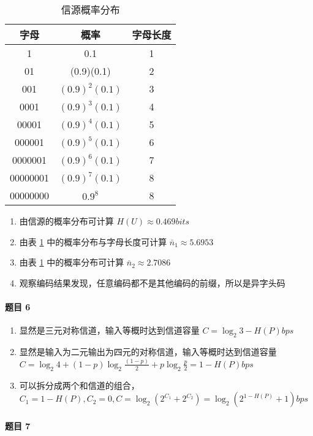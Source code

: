 \documentclass{ctexart}
\begin{document}
\begin{table}[H]
    \centering
    \caption{信源概率分布}
    \label{tab.5}
    \begin{tabular}{ccc}
        \hline
        字母 & 概率 & 字母长度 \\
        \hline
        1 & 0.1 & 1 \\
        01 & (0.9)(0.1) & 2 \\
        001 & $(0.9)^2(0.1)$ & 3 \\
        0001 & $(0.9)^3(0.1)$ & 4 \\
        00001 & $(0.9)^4(0.1)$ & 5 \\
        000001 & $(0.9)^5(0.1)$ & 6 \\
        0000001 & $(0.9)^6(0.1)$ & 7 \\
        00000001 & $(0.9)^7(0.1)$ & 8 \\
        00000000 & $0.9^8$ & 8 \\
        \hline
    \end{tabular}
\end{table}

\begin{enumerate}
    \item 由信源的概率分布可计算 $H(U) \approx 0.469 bits$
    \item 由表 \ref{tab.5} 中的概率分布与字母长度可计算 $\bar{n}_1 \approx 5.6953$
    \item 由表 \ref{tab.5} 中的概率分布可计算 $\bar{n}_2 \approx 2.7086$
    \item 观察编码结果发现，任意编码都不是其他编码的前缀，所以是异字头码
\end{enumerate}

\paragraph{题目 6}

\begin{enumerate}
    \item 显然是三元对称信道，输入等概时达到信道容量 $C = \log_2 3 - H(P) bps$
    \item 显然是输入为二元输出为四元的对称信道，输入等概时达到信道容量 $C = \log_2 4 + (1 - p)\log_2\frac{(1 - p)}{2} + p\log_2\frac{p}{2} = 1 - H(P) bps$
    \item 可以拆分成两个和信道的组合，$C_1 = 1 - H(P), C_2 = 0, C = \log_2(2^{C_1} + 2^{C_2}) = \log_2(2^{1 - H(P)} + 1) bps$
\end{enumerate}

\paragraph{题目 7}
\end{document}
